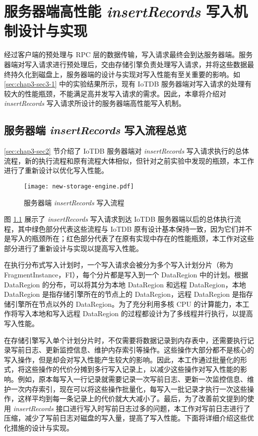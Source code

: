 
\chapter{服务器端高性能 \emph{insertRecords} 写入机制设计与实现}
经过客户端的预处理与 RPC 层的数据传输，写入请求最终会到达服务器端。服务器端对写入请求进行预处理后，交由存储引擎负责处理写入请求，并将这些数据最终持久化到磁盘上，服务器端的设计与实现对写入性能有至关重要的影响。如 \ref{sec:chap3-sec3-1} 中的实验结果所示，现有 IoTDB 服务器端对写入请求的处理有较大的性能瓶颈，不能满足高并发写入请求的需求。因此，本章将介绍对 \emph{insertRecords} 写入请求所设计的服务器端高性能写入机制。


\section{服务器端 \emph{insertRecords} 写入流程总览}
\ref{sec:chap3-sec2} 节介绍了 IoTDB 服务器端对 \emph{insertRecords} 写入请求执行的总体流程，新的执行流程和原有流程大体相似，但针对之前实验中发现的瓶颈，本工作进行了重新设计以优化写入性能。

\begin{figure}
  \centering
  \texttt{[image: new-storage-engine.pdf]}
  \caption{服务器端 \emph{insertRecords} 写入流程}
  \label{fig:iotdb-insertRecords-flow}
\end{figure}

图 \ref{fig:iotdb-insertRecords-flow} 展示了 \emph{insertRecords} 写入请求到达 IoTDB 服务器端以后的总体执行流程，其中绿色部分代表这些流程与 IoTDB 原有设计基本保持一致，因为它们并不是写入的瓶颈所在；红色部分代表了在原有实现中存在的性能瓶颈，本工作对这些部分进行了重新设计与实现以提高写入性能。


在执行分布式写入计划时，一个写入请求会被分为多个写入计划分片（称为 FragmentInstance，FI），每个分片都是写入到一个 DataRegion 中的计划。根据 DataRegion 的分布，可以将其分为本地 DataRegion 和远程 DataRegion，本地 DataRegion 是指存储引擎所在的节点上的 DataRegion，远程 DataRegion 是指存储引擎所在节点以外的 DataRegion。为了充分利用多核 CPU 的计算能力，本工作将写入本地和写入远程 DataRegion 的过程都设计为了多线程并行执行，以提高写入性能。

在存储引擎写入单个计划分片时，不仅需要将数据记录到内存表中，还需要执行记录写前日志、更新监控信息、维护内存索引等操作。这些操作大部分都不是核心的写入操作，但是却会对写入性能产生较大的影响。因此，本工作通过批量化的形式，将这些操作的代价分摊到多行写入记录上，以减少这些操作对写入性能的影响。例如，原本每写入一行记录就需要记录一次写前日志、更新一次监控信息、维护一次内存索引，现在可以将这些操作批量化，每写入一批记录才执行一次这些操作，这样平均到每一条记录上的代价就大大减小了。最后，为了改善前文提到的使用 \emph{insertRecords} 接口进行写入时写前日志过多的问题，本工作对写前日志进行了压缩，减少了写前日志对磁盘的写入量，提高了写入性能。下面将详细介绍这些优化措施的设计与实现。

